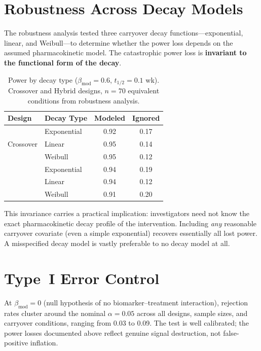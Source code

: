 \documentclass[11pt]{article}
\begin{document}
\section{Robustness Across Decay Models}

The robustness analysis tested three carryover decay
functions---exponential, linear, and
Weibull---to determine whether the power loss depends
on the assumed pharmacokinetic model.
The catastrophic power loss is \textbf{invariant to
the functional form of the decay}.

\begin{table}[ht]
\centering
\caption{Power by decay type
($\beta_{\mathrm{mod}}=0.6$, $t_{1/2}=0.1$ wk).
Crossover and Hybrid designs, $n=70$ equivalent
conditions from robustness analysis.}
\label{tab:robustness}
\begin{tabular}{ll cc}
\toprule
Design & Decay Type & Modeled & Ignored \\
\midrule
\multirow{3}{*}{Crossover}
  & Exponential & 0.92 & 0.17 \\
  & Linear      & 0.95 & 0.14 \\
  & Weibull     & 0.95 & 0.12 \\
\addlinespace
\multirow{3}{*}{Hybrid}
  & Exponential & 0.94 & 0.19 \\
  & Linear      & 0.94 & 0.12 \\
  & Weibull     & 0.91 & 0.20 \\
\bottomrule
\end{tabular}
\end{table}

\noindent
This invariance carries a practical implication:
investigators need not know the exact pharmacokinetic
decay profile of the intervention.
Including \emph{any} reasonable carryover covariate
(even a simple exponential) recovers essentially
all lost power.
A misspecified decay model is vastly preferable to
no decay model at all.

\section{Type~I Error Control}

At $\beta_{\mathrm{mod}} = 0$ (null hypothesis of no
biomarker--treatment interaction), rejection rates
cluster around the nominal $\alpha = 0.05$ across all
designs, sample sizes, and carryover conditions,
ranging from 0.03 to 0.09.
The test is well calibrated; the power losses documented
above reflect genuine signal destruction, not
false-positive inflation.
\end{document}
